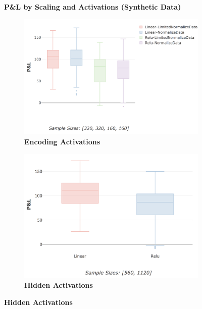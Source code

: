 \documentclass[a4paper,11pt,oneside]{article}
\theoremstyle{plain}
\theoremstyle{definition}
\begin{document}
	
	\begin{figure}[H]
		\centering
		\textbf{P\&L by Scaling and Activations (Synthetic Data)}
		\begin{subfigure}{.5\textwidth}
			\centering 
			\includegraphics[scale=0.25]{images/results/activations/synth_pl_scaling.png}
			\caption[P\&L by Scaling and Activations (Synthetic Data) - Encoding Activations]{\textbf{Encoding Activations} 
				\newline }
			\label{figure-synth_pl_scaling}
		\end{subfigure}%
		\begin{subfigure}{.5\textwidth}
			\centering 
			\includegraphics[scale=0.25]{images/results/activations/synth_pl_hidden.png}
			\caption[P\&L by Scaling and Activations (Synthetic Data) - Hidden Activations]{\textbf{Hidden Activations} 
				\newline }

\end{subfigure}
\end{figure}
\end{document}
